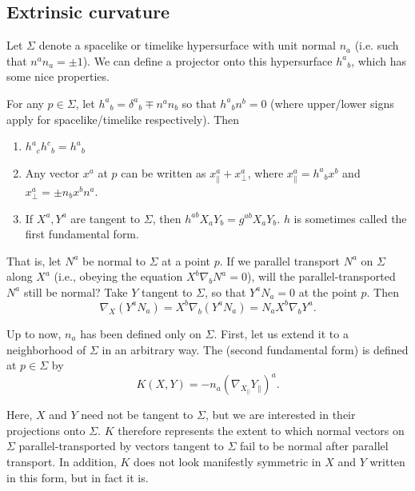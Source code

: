 \subsection*{Extrinsic curvature}
Let $\Sigma$ denote a spacelike or timelike hypersurface with unit normal $n_a$ (i.e. such that $n^a n_a=\pm 1$). We can define a projector onto this hypersurface $h^a{}_b$, which has some nice properties.
\begin{lem}
    For any $p\in \Sigma$, let $h^a{}_b = \delta^a{}_b \mp n^a n_b$ so that $h^a{}_b n^b =0$ (where upper/lower signs apply for spacelike/timelike respectively). Then
    \begin{enumerate}
        \item $h^a{}_c h^c{}_b=h^a{}_b$
        \item Any vector $x^a$ at $p$ can be written as $x^a_\parallel + x^a_\bot$, where $x^a_\parallel = h^a{}_b x^b$ and $x^a_\bot = \pm n_b x^b n^a$.
        \item If $X^a,Y^a$ are tangent to $\Sigma$, then $h^{ab} X_a Y_b=g^{ab} X_a Y_b$. $h$ is sometimes called the first fundamental form. 
    \end{enumerate}
\end{lem}
That is, let $N^a$ be normal to $\Sigma$ at a point $p$. If we parallel transport $N^a$ on $\Sigma$ along $X^a$ (i.e., obeying the equation $X^b \nabla_b N^a=0$), will the parallel-transported $N^a$ still be normal? Take $Y$ tangent to $\Sigma$, so that $Y^a N_a=0$ at the point $p$. Then
\begin{equation}
    \nabla_X (Y^a N_a)=X^b \nabla_b(Y^a N_a)=N_a X^b \nabla_b Y^a.
\end{equation}
\begin{defn}
    Up to now, $n_a$ has been defined only on $\Sigma$. First, let us extend it to a neighborhood of $\Sigma$ in an arbitrary way. The  (second fundamental form) is defined at $p\in \Sigma$ by
    \begin{equation}
        K(X,Y)=-n_a(\nabla_{X_\parallel} Y_{\parallel})^a.
    \end{equation}
\end{defn}
Here, $X$ and $Y$ need not be tangent to $\Sigma$, but we are interested in their projections onto $\Sigma$. $K$ therefore represents the extent to which normal vectors on $\Sigma$ parallel-transported by vectors tangent to $\Sigma$ fail to be normal after parallel transport. In addition, $K$ does not look manifestly symmetric in $X$ and $Y$ written in this form, but in fact it is.

